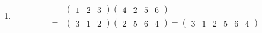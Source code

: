 \begin{example}[轮换的合并与截断]
	\begin{enumerate}
		\item 
		\begin{equation}\begin{aligned}
		&\begin{pmatrix}
		1&2&3
		\end{pmatrix}
		\begin{pmatrix}
		4&2&5&6
		\end{pmatrix}\\
		{}={}&\begin{pmatrix}
		3&1&2
		\end{pmatrix}
		\begin{pmatrix}
		2&5&6&4
		\end{pmatrix}
		=\begin{pmatrix}
		3&1&2&5&6&4
		\end{pmatrix}
		\end{aligned}\end{equation}
		

\end{enumerate}
\end{example}
